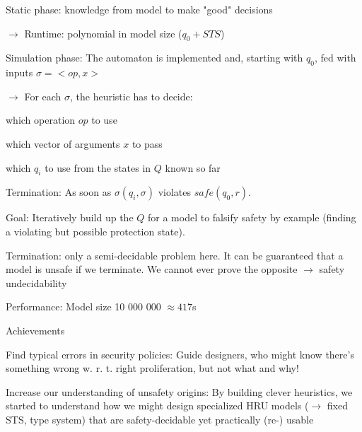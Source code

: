 \documentclass[a4paper]{article}
\begin{document}
\begin{multicols}{3}
\begin{enumerate*}
        \item Static phase: knowledge from model to make "good" decisions
        \begin{itemize*}
            \item $\rightarrow$  Runtime: polynomial in model size ($q_0 + STS$)
        \end{itemize*}
        \item Simulation phase: The automaton is implemented and, starting with $q_0$, fed with inputs $\sigma=<op,x>$
        \begin{itemize*}
            \item $\rightarrow$  For each $\sigma$, the heuristic has to decide:
            \item which operation $op$ to use
            \item which vector of arguments $x$ to pass
            \item which $q_i$ to use from the states in $Q$ known so far
            \item Termination: As soon as $\sigma(q_i,\sigma)$ violates $safe(q_0,r)$.
        \end{itemize*}
    \end{enumerate*}

    Goal: Iteratively build up the $Q$ for a model to falsify safety by example (finding a violating but possible protection state).

    \begin{itemize*}
        \item Termination: only a semi-decidable problem here. It can be guaranteed that a model is unsafe if we terminate. We cannot ever prove the opposite $\rightarrow$ safety undecidability
        \item Performance: Model size 10 000 000 $\approx 417$s
    \end{itemize*}

    Achievements
    \begin{itemize*}
        \item Find typical errors in security policies: Guide designers, who might know there’s something wrong w. r. t. right proliferation, but not what and why!
        \item Increase our understanding of unsafety origins: By building clever heuristics, we started to understand how we might design specialized HRU models ($\rightarrow$ fixed STS, type system) that are safety-decidable yet practically (re-) usable
    \end{itemize*}


\end{multicols}
\end{document}
